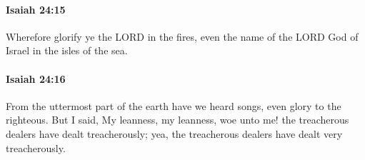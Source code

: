 		\paragraph{Isaiah 24:15} %
			\label{ISAIAH-24-15}

			Wherefore glorify ye the LORD in the fires, even the name of the LORD God of Israel in the isles of the sea.


		\paragraph{Isaiah 24:16} %
			\label{ISAIAH-24-16}

			From the uttermost part of the earth have we heard songs, even glory to the righteous. But I said, My leanness, my leanness, woe unto me! the treacherous dealers have dealt treacherously; yea, the treacherous dealers have dealt very treacherously.


